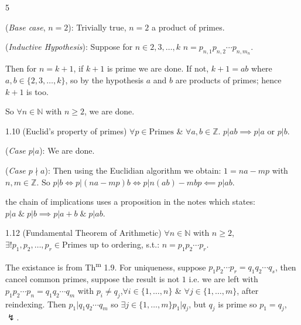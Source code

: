 \documentclass[8pt]{extarticle}
\makeatletter
\renewenvironment{proof}[1][\proofname]{%
  \par%
  \pushQED{\qed}%
  \normalfont
  \topsep=2pt\partopsep=0pt\parsep=0pt\itemsep=0pt%
  \trivlist
  \item[\hskip\labelsep\itshape #1\@addpunct{.}]\ignorespaces
}{%
  \popQED\endtrivlist\@endpefalse
  \vspace{-1pt}%
}
\makeatother
\begin{document}
\begin{multicols*}{5}
\begin{proof}
            (\textit{Base case}, \(n=2\)): Trivially true, \(n=2\) a product of primes.

            (\textit{Inductive Hypothesis}): Suppose for \(n\in{2,3,\ldots,k}\) \(n=p_{n,1}p_{n,2}\cdots p_{n,m_n}\).
            
            Then for \(n=k+1\), if \(k+1\) is prime we are done. If not, \(k+1=ab\) where \(a,b\in\{2,3,\ldots,k\}\), so by the hypothesis \(a\) and \(b\) are products of primes; hence \(k+1\) is too.

            So \(\forall n\in\mathbb{N}\) with \(n\ge2\), we are done.

        \end{proof}

        \begin{theorem}{1.10}
            (Euclid's property of primes) \(\forall p\in \text{Primes}\) \& \(\forall a,b\in\mathbb{Z}\). \(p|ab\implies p|a\text{ or } p|b\).
        \end{theorem}

        \begin{proof}
            (\textit{Case \(p|a\)}): We are done.

            (\textit{Case \(p\nmid a\)}): Then using the Euclidian algorithm we obtain: \(1=na-mp\) with \(n,m\in\mathbb{Z}\).
            So \(p|b\Longleftrightarrow p|(na-mp)b\Longleftrightarrow p|n(ab)-mbp\impliedby p|ab\).
        \end{proof}

        {\footnotesize the chain of implications uses a proposition in the notes which states: \(p|a\;\&\;p|b\implies p|a+b\;\&\;p|ab\)}.

        \begin{theorem}{1.12}
            (Fundamental Theorem of Arithmetic) \(\forall n\in\mathbb{N}\) with \(n\ge2\), \(\exists! p_1,p_2,\ldots,p_r\in\text{Primes}\) up to ordering, s.t.: \(n=p_1p_2\cdots p_r\).
        \end{theorem}

        \begin{proof}
            The existance is from Th\textsuperscript{m} 1.9. For uniqueness, suppose \(p_1p_2\cdots p_r=q_1q_2\cdots q_s\), then cancel common primes, suppose the result is not \(1\) i.e. we are left with \(p_1p_2\cdots p_n=q_1q_2\cdots q_m\) with \(p_i\ne q_j\),\(\forall i\in\{1,\ldots,n\}\) \& \(\forall j\in\{1,\ldots,m\}\), after reindexing. Then \(p_1|q_1q_2\cdots q_m\) so \(\exists j\in\{1,\ldots,m\}\)\(p_1|q_j\), but \(q_j\) is prime so \(p_1=q_j\), \(\lightning\).
        \end{proof}


\end{multicols*}
\end{document}
